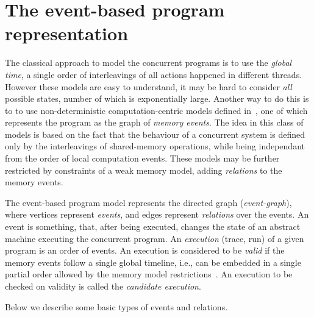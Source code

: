 

\section{The event-based program representation}

The classical approach to model the concurrent programs is to use the \textit{global time}, a single order of interleavings of all actions happened in different threads. However these models are easy to understand, it may be hard to consider \textit{all} possible states, number of which is exponentially large. Another way to do this is to to use non-deterministic computation-centric models defined in~\cite{fri97}, one of which represents the program as the graph of \textit{memory events}. The idea in this class of models is based on the fact that the behaviour of a concurrent system is defined only by the interleavings of shared-memory operations, while being independant from the order of local computation events. These models may be further restricted by constraints of a weak memory model, adding \textit{relations} to the memory events.

The event-based program model represents the directed graph (\textit{event-graph}), where vertices represent \textit{events}, and edges represent \textit{relations} over the events. An event is something, that, after being executed, changes the state of an abstract machine executing the concurrent program. 
An \textit{execution} (trace, run) of a given program is an order of events.
An execution is considered to be \textit{valid} if the memory events follow a single global timeline, i.e., can be embedded in a single partial order allowed by the memory model restrictions~\cite{alglave2010shared}. An execution to be checked on validity is called the \textit{candidate execution}.

Below we describe some basic types of events and relations.

